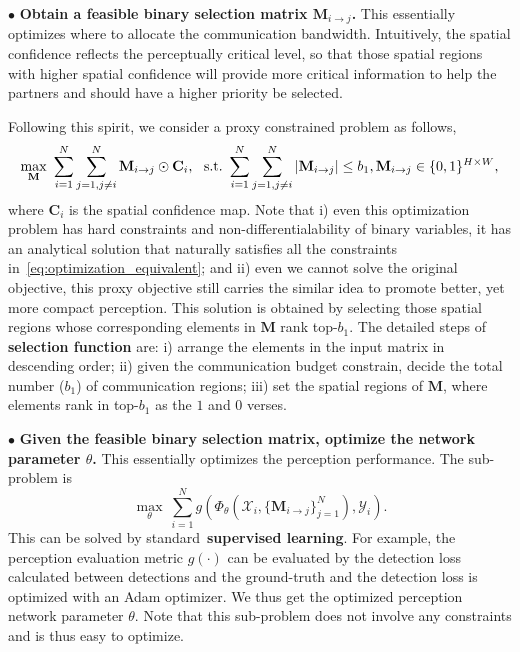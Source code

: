 $\bullet $ \textbf{Obtain  a feasible binary selection matrix $\mathbf{M}_{i\rightarrow j}$.} This essentially optimizes where to allocate the communication bandwidth. Intuitively, the spatial confidence reflects the perceptually critical level, so that those spatial regions with higher spatial confidence will provide more critical information to help the partners and should have a higher priority be selected.

Following this spirit, we consider a proxy constrained problem as follows,
\begin{equation*}
    \underset{\mathbf{M}}{\max}~\sum_{i=1}^{N}\sum_{j=1,j\neq i}^{N}  
    \mathbf{M}_{i\rightarrow j} \odot \mathbf{C}_i,~
    ~{\rm s.t.~}  \sum_{i=1}^{N}\sum_{j=1,j\neq i}^{N}|\mathbf{M}_{i\rightarrow j}| \leq b_1, \mathbf{M}_{i\rightarrow j}\in\{0,1\}^{H\times W},
\end{equation*}
where $\mathbf{C}_i$ is the spatial confidence map. Note that i) even this optimization problem has hard constraints and non-differentialability of binary variables, it has an analytical solution that naturally satisfies all the constraints in~\eqref{eq:optimization_equivalent}; and ii) even we cannot solve the original objective, this proxy objective still carries the similar idea to promote better, yet more compact perception. This solution is obtained by selecting those spatial regions whose corresponding elements in $\mathbf{M}$ rank top-$b_1$. The detailed steps of \textbf{selection function} are: i) arrange the elements in the input matrix in descending order; ii) given the communication budget constrain, decide the total number ($b_1$) of communication regions; iii) set the spatial regions of $\mathbf{M}$, where elements rank in top-$b_1$ as the $1$ and $0$ verses.


$\bullet $ \textbf{Given the feasible binary selection matrix, optimize the network parameter $\theta$.}  This essentially optimizes the perception performance. The sub-problem is
\begin{equation*}
    \underset{\theta}{\max}~\sum_{i=1}^{N} 
    g \left(\Phi_{\theta} \left(\mathcal{X}_i,\{\mathbf{M}_{i\rightarrow j}\}_{j=1}^N 
    \right), \mathcal{Y}_i  \right).
\end{equation*}
This can be solved by standard~\textbf{supervised learning}. For example, the perception evaluation metric $g(\cdot)$ can be evaluated by the  detection loss calculated between detections and the ground-truth and the detection loss is optimized with an Adam optimizer. We thus get the optimized perception network parameter $\theta$. Note that this sub-problem does not involve any constraints and is thus easy to optimize.






